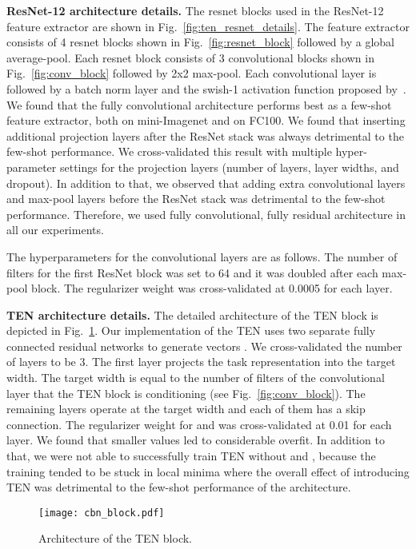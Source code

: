 \documentclass{article}
\begin{document}
\textbf{ResNet-12 architecture details.} The resnet blocks used in the ResNet-12 feature extractor are shown in Fig.~\ref{fig:ten_resnet_details}. The feature extractor consists of 4 resnet blocks shown in Fig.~\ref{fig:resnet_block} followed by a global average-pool. Each resnet block consists of 3 convolutional blocks shown in Fig.~\ref{fig:conv_block} followed by 2x2 max-pool. Each convolutional layer is followed by a batch norm layer and the swish-1 activation function proposed by~\citet{Ramachandran2017searching}. We found that the fully convolutional architecture performs best as a few-shot feature extractor, both on mini-Imagenet and on FC100. We found that inserting additional projection layers after the ResNet stack was always detrimental to the few-shot performance. We cross-validated this result with multiple hyper-parameter settings for the projection layers (number of layers, layer widths, and dropout). In addition to that, we observed that adding extra convolutional layers and max-pool layers before the ResNet stack was detrimental to the few-shot performance. Therefore, we used fully convolutional, fully residual architecture in all our experiments.

The hyperparameters for the convolutional layers are as follows. The number of filters for the first ResNet block was set to 64 and it was doubled after each max-pool block. The  regularizer weight was cross-validated at 0.0005 for each layer.

\textbf{TEN architecture details.} The detailed architecture of the TEN block is depicted in Fig.~\ref{fig:tbn_block}. Our implementation of the TEN uses two separate fully connected residual networks to generate vectors . We cross-validated the number of layers to be 3. The first layer projects the task representation into the target width. The target width is equal to the number of filters of the convolutional layer that the TEN block is conditioning (see Fig.~\ref{fig:conv_block}). The remaining layers operate at the target width and each of them has a skip connection. The  regularizer weight for  and   was cross-validated at 0.01 for each layer. We found that smaller values led to considerable overfit. In addition to that, we were not able to successfully train TEN without  and , because the training tended to be stuck in local minima where the overall effect of introducing TEN was detrimental to the few-shot performance of the architecture.

\begin{figure}[t]
    \centering
    \texttt{[image: cbn\_block.pdf]}
    \caption{Architecture of the TEN block.}
    \label{fig:tbn_block}
\end{figure}
\end{document}
